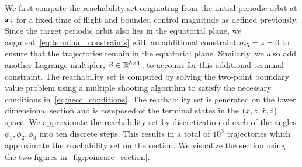 \documentclass[]{aiaa-tc}%
\begin{document}
We first compute the reachability set originating from the initial periodic orbit at \( \bm{x}_i\) for a fixed time of flight and bounded control magnitude as defined previously.
Since the target periodic orbit also lies in the equatorial plane, we augment~\cref{eq:terminal_constraints} with an additional constraint \( m_5 = z = 0\) to ensure that the trajectories remain in the equatorial plane.
Similarly, we also add another Lagrange multipler, \( \beta \in \mathbb{R}^{5 \times 1}\), to account for this additional terminal constraint.
The reachability set is computed by solving the two-point boundary value problem using a multiple shooting algorithm to satisfy the necessary conditions in~\cref{eq:necc_conditions}.
The reachability set is generated on the lower dimensional \Poincare section and is composed of the terminal states in the \( \left( x,z,\dot{x},\dot{z}  \right) \) space.
We approximate the reachability set by discretization of each of the angles \( \phi_1, \phi_2 , \phi_3 \) into ten discrete steps. 
This results in a total of \(10^3\) trajectories which approximate the reachability set on the \Poincare section.
We visualize the section using the two figures in~\cref{fig:poincare_section}.
\end{document}
